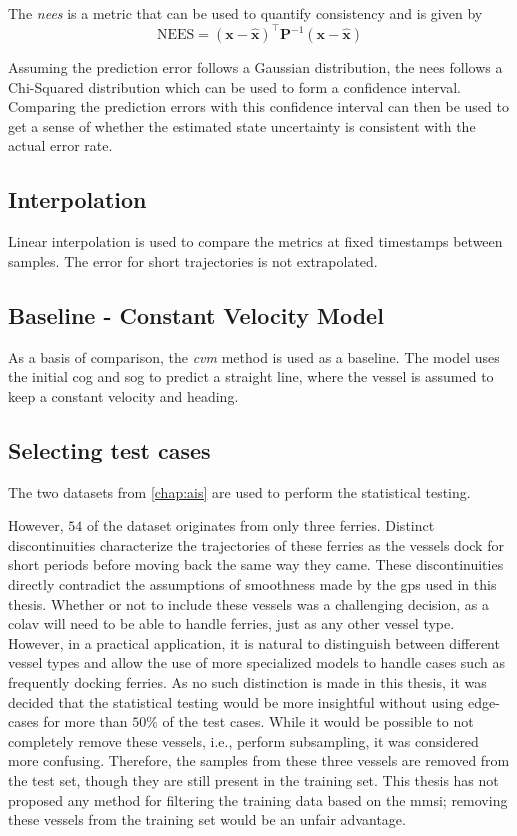The \textit{\acrfull{nees}} is a metric that can be used to quantify consistency and is given by
\begin{equation}
    \text{NEES} = (\boldsymbol{x} - \hat{\boldsymbol{x}})^\intercal \boldsymbol{P}^{-1} (\boldsymbol{x} - \hat{\boldsymbol{x}})
\end{equation}

Assuming the prediction error follows a Gaussian distribution, the \acrshort{nees} follows a Chi-Squared distribution which can be used to form a confidence interval. Comparing the prediction errors with this confidence interval can then be used to get a sense of whether the estimated state uncertainty is consistent with the actual error rate.

\subsection{Interpolation}
Linear interpolation is used to compare the metrics at fixed timestamps between samples. The error for short trajectories is not extrapolated.

\subsection{Baseline - Constant Velocity Model}
As a basis of comparison, the \textit{\acrfull{cvm}} method is used as a baseline. The model uses the initial \acrshort{cog} and \acrshort{sog} to predict a straight line, where the vessel is assumed to keep a constant velocity and heading.

\subsection{Selecting test cases}
The two datasets from \cref{chap:ais} are used to perform the statistical testing.

However, $54$ of the dataset originates from only three ferries. Distinct discontinuities characterize the trajectories of these ferries as the vessels dock for short periods before moving back the same way they came. These discontinuities directly contradict the assumptions of smoothness made by the \acrshort{gp}s used in this thesis. Whether or not to include these vessels was a challenging decision, as a \acrshort{colav} will need to be able to handle ferries, just as any other vessel type. However, in a practical application, it is natural to distinguish between different vessel types and allow the use of more specialized models to handle cases such as frequently docking ferries. As no such distinction is made in this thesis, it was decided that the statistical testing would be more insightful without using edge-cases for more than $50\%$ of the test cases. While it would be possible to not completely remove these vessels, i.e., perform subsampling, it was considered more confusing. Therefore, the samples from these three vessels are removed from the test set, though they are still present in the training set. This thesis has not proposed any method for filtering the training data based on the \acrshort{mmsi}; removing these vessels from the training set would be an unfair advantage.

